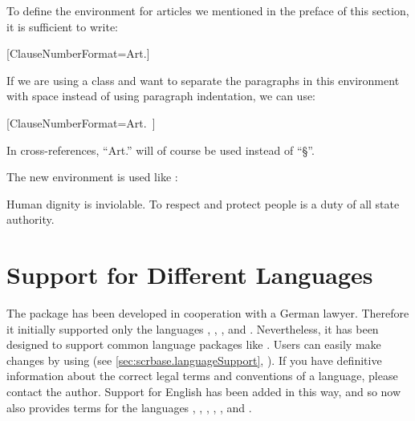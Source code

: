 \begin{Example}
  To define the environment for articles we mentioned in the preface of this
  section, it is sufficient to write:
\begin{lstcode}
  [ClauseNumberFormat=Art.]{}{}
\end{lstcode}
  If we are using a \KOMAScript{} class and want to separate the paragraphs in
  this environment with space instead of using paragraph indentation, we can
  use:
\begin{lstcode}
  [ClauseNumberFormat=Art.~]
                            {}{}
\end{lstcode}
  In cross-references, ``Art.'' will  of course be used instead of ``\S''.%

  The new environment is used like :
\begin{lstcode}
  \begin{Article}
    \Clause
    Human dignity is inviolable. To respect and protect people is a
    duty of all state authority.
  \end{Article}
\end{lstcode}
\end{Example}%
\EndIndexGroup


\section{Support for Different Languages}
\label{sec:scrjura.babel}

The  package has been developed in cooperation with a German
lawyer. Therefore it initially supported only the languages ,
, , and . Nevertheless, it
has been designed to support common language packages like
. Users can
easily make changes by using  (see
\autoref{sec:scrbase.languageSupport},
). If you have definitive
information about the correct legal terms and conventions of a language,
please contact the \KOMAScript{} author. Support for English has been added in
this way, and so  now also provides terms for the languages
, , , ,
, and .

